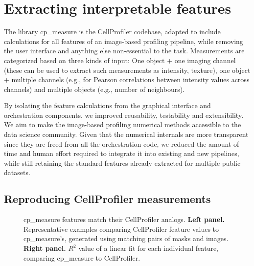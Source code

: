 \documentclass{article}
\begin{document}
\section{Extracting interpretable features}
\label{sec:org61842b5}
The library cp\_measure is  the CellProfiler codebase, adapted to include calculations for all features of an image-based profiling pipeline, while removing the user interface and anything else non-essential to the task. Measurements are categorized based on three kinds of input: One object + one imaging channel (these can be used to extract such measurements as intensity, texture), one object + multiple channels (e.g., for Pearson correlations between intensity values across channels) and multiple objects (e.g., number of neighbours).

By isolating the feature calculations from the graphical interface and orchestration components, we improved reusability, testability and extensibility. We aim to make the image-based profiling numerical methods accessible to the data science community. Given that the numerical internals are more transparent since they are freed from all the orchestration code, we reduced the amount of time and human effort required to integrate it into existing and new pipelines, while still retaining the standard features already extracted for multiple public datasets.

\subsection{Reproducing CellProfiler measurements}
\label{sec:org09b0cd2}

\begin{figure}[htbp]
\centering

\caption{\label{fig:cp_vs_cpmeasure}cp\_measure features match their CellProfiler analogs. \textbf{Left panel.} Representative examples comparing CellProfiler feature values to cp\_measure's, generated using matching pairs of masks and images. \textbf{Right panel.} \(R^2\) value of a linear fit for each individual feature, comparing cp\_measure to CellProfiler.}
\end{figure}
\end{document}
